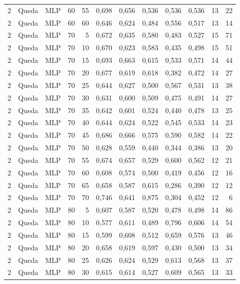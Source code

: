 \begin{longtable}{@{}rllrrrrrrrrr@{}}
2 & Queda & MLP & 60 & 55 & 0,698 & 0,656 & 0,536 & 0,536 & 0,536 & 13 & 22 \\
2 & Queda & MLP & 60 & 60 & 0,646 & 0,624 & 0,484 & 0,556 & 0,517 & 13 & 14 \\
2 & Queda & MLP & 70 & 5 & 0,672 & 0,635 & 0,580 & 0,483 & 0,527 & 15 & 71 \\
2 & Queda & MLP & 70 & 10 & 0,670 & 0,623 & 0,583 & 0,435 & 0,498 & 15 & 51 \\
2 & Queda & MLP & 70 & 15 & 0,693 & 0,663 & 0,615 & 0,533 & 0,571 & 14 & 44 \\
2 & Queda & MLP & 70 & 20 & 0,677 & 0,619 & 0,618 & 0,382 & 0,472 & 14 & 27 \\
2 & Queda & MLP & 70 & 25 & 0,644 & 0,627 & 0,500 & 0,567 & 0,531 & 13 & 38 \\
2 & Queda & MLP & 70 & 30 & 0,631 & 0,600 & 0,509 & 0,475 & 0,491 & 14 & 27 \\
2 & Queda & MLP & 70 & 35 & 0,642 & 0,601 & 0,524 & 0,440 & 0,478 & 13 & 25 \\
2 & Queda & MLP & 70 & 40 & 0,644 & 0,624 & 0,522 & 0,545 & 0,533 & 14 & 23 \\
2 & Queda & MLP & 70 & 45 & 0,686 & 0,666 & 0,575 & 0,590 & 0,582 & 14 & 22 \\
2 & Queda & MLP & 70 & 50 & 0,628 & 0,559 & 0,440 & 0,344 & 0,386 & 13 & 20 \\
2 & Queda & MLP & 70 & 55 & 0,674 & 0,657 & 0,529 & 0,600 & 0,562 & 12 & 21 \\
2 & Queda & MLP & 70 & 60 & 0,608 & 0,574 & 0,500 & 0,419 & 0,456 & 12 & 16 \\
2 & Queda & MLP & 70 & 65 & 0,658 & 0,587 & 0,615 & 0,286 & 0,390 & 12 & 12 \\
2 & Queda & MLP & 70 & 70 & 0,746 & 0,641 & 0,875 & 0,304 & 0,452 & 12 & 6 \\
2 & Queda & MLP & 80 & 5 & 0,607 & 0,587 & 0,520 & 0,478 & 0,498 & 14 & 86 \\
2 & Queda & MLP & 80 & 10 & 0,577 & 0,611 & 0,489 & 0,796 & 0,606 & 14 & 54 \\
2 & Queda & MLP & 80 & 15 & 0,599 & 0,608 & 0,512 & 0,659 & 0,576 & 13 & 46 \\
2 & Queda & MLP & 80 & 20 & 0,658 & 0,619 & 0,597 & 0,430 & 0,500 & 13 & 34 \\
2 & Queda & MLP & 80 & 25 & 0,626 & 0,624 & 0,529 & 0,613 & 0,568 & 13 & 37 \\
2 & Queda & MLP & 80 & 30 & 0,615 & 0,614 & 0,527 & 0,609 & 0,565 & 13 & 33 \\

\end{longtable}
